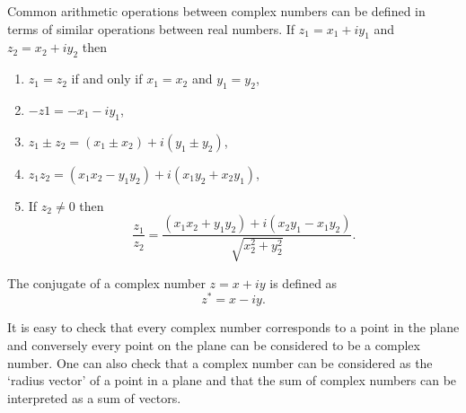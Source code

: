 Common arithmetic operations between complex numbers can be defined in terms 
of similar operations between real numbers. If $z_1 = x_1 + iy_1$ and $z_2 = 
x_2 + iy_2$ then
\begin{enumerate}
\item $z_1 = z_2$ if and only if $x_1 = x_2$ and $y_1 = y_2$,
\item $-z1 = -x_1 - iy_1$,
\item $z_1 \pm z_2 = (x_1 \pm x_2) + i(y_1 \pm y_2)$,
\item $z_1z_2 = (x_1x_2 - y_1y_2) + i(x_1y_2 + x_2y_1)$,
\item If $z_2 \ne 0$ then
\[
\frac{z_1}{z_2} = 
\frac{(x_1x_2 + y_1y_2) + i(x_2y_1 - x_1y_2)}{\sqrt{x_2^2 + y_2^2}}.
\]
\end{enumerate}

The conjugate of a complex number $z = x + iy$ is defined as
\begin{equation}\label{c1s3e2}
z^\ast = x - iy.
\end{equation}


It is easy to check that every complex number corresponds to a point in the 
plane and conversely every point on the plane can be considered to be a 
complex number. One can also check that a complex number can be considered as 
the `radius vector' of a point in a plane and that the sum of complex numbers 
can be interpreted as a sum of vectors.

